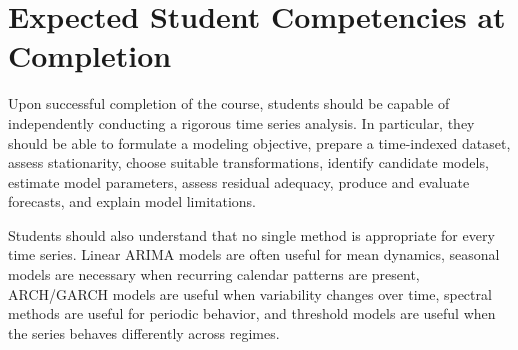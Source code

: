 \documentclass[11pt]{article}
\begin{document}
\section{Expected Student Competencies at Completion}

Upon successful completion of the course, students should be capable of independently conducting a rigorous time series analysis. In particular, they should be able to formulate a modeling objective, prepare a time-indexed dataset, assess stationarity, choose suitable transformations, identify candidate models, estimate model parameters, assess residual adequacy, produce and evaluate forecasts, and explain model limitations.

Students should also understand that no single method is appropriate for every time series. Linear ARIMA models are often useful for mean dynamics, seasonal models are necessary when recurring calendar patterns are present, ARCH/GARCH models are useful when variability changes over time, spectral methods are useful for periodic behavior, and threshold models are useful when the series behaves differently across regimes.
\end{document}
